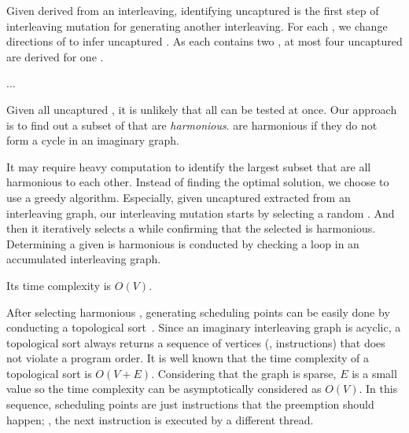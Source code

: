 %
Given \segments derived from an interleaving, identifying uncaptured
\segments is the first step of interleaving mutation for generating
another interleaving.
%
For each \segment, we change directions of \mutables to infer
uncaptured \segments.
%
As each \segment contains two \mutables, at most four uncaptured
\segments are derived for one \segment.

...






%
Given all uncaptured \segments, it is unlikely that all \segments can
be tested at once.
%
Our approach is to find out a subset of \segments that are
\textit{harmonious}. \Segments are harmonious if they do not form a
cycle in an imaginary graph.


It may require heavy computation to identify the largest subset that
are all harmonious to each other.
%
Instead of finding the optimal solution, we choose to use a greedy
algorithm.
%
Especially, given uncaptured \segments extracted from an interleaving
graph, our interleaving mutation starts by selecting a random
\segment.
%
And then it iteratively selects a \segment while confirming that the
selected \segment is harmonious.
%
Determining a given \segment is harmonious is conducted by checking a
loop in an accumulated interleaving graph.

Its time complexity is $O(V)$.


%
After selecting harmonious \segments, generating scheduling points can
be easily done by conducting a topological
sort~\cite{topologicalsort}.
%
Since an imaginary interleaving graph is acyclic, a topological sort
always returns a sequence of vertices (\ie, instructions) that does
not violate a program order.
%
It is well known that the time complexity of a topological sort is
$O(V+E)$. Considering that the graph is sparse, $E$ is a small value
so the time complexity can be asymptotically considered as $O(V)$.
%
In this sequence, scheduling points are just instructions that the
preemption should happen; \ie, the next instruction is executed by a
different thread.
%




